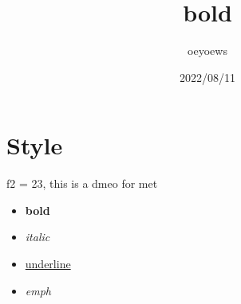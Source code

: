 \documentclass[UTF8]{article}
\title{bold}
\author{oeyoews}
\date{2022/08/11}
\begin{document}
\maketitle


\section{ Style}%
\label{sec:Style}

f2 = 23, this is a dmeo for met

\begin{itemize}
  \item  \textbf{bold}
  \item \textit{italic}
  \item \underline{underline}
  \item{\emph{emph}}
\end{itemize}
\end{document}
